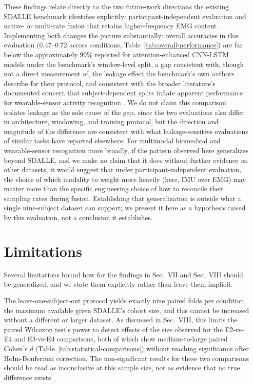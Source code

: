 \documentclass[conference]{IEEEtran}
\begin{document}
These findings relate directly to the two future-work directions the
existing SDALLE benchmark identifies explicitly: participant-independent
evaluation and native- or multi-rate fusion that retains
higher-frequency EMG content \cite{farouk2026sdalle}. Implementing
both changes the picture substantially: overall accuracies in this
evaluation ($0.47$--$0.72$ across conditions,
Table~\ref{tab:overall-performance}) are far below the approximately
99\% reported for attention-enhanced CNN-LSTM models under the
benchmark's window-level split, a gap consistent with, though not a
direct measurement of, the leakage effect the benchmark's own authors
describe for their protocol, and consistent with the broader
literature's documented concern that subject-dependent splits inflate
apparent performance for wearable-sensor activity recognition
\cite{rehman2024validation, cai2025generalizablehar}. We do not claim
this comparison isolates leakage as the sole cause of the gap, since
the two evaluations also differ in architecture, windowing, and
training protocol, but the direction and magnitude of the difference
are consistent with what leakage-sensitive evaluations of similar
tasks have reported elsewhere. For multimodal biomedical and
wearable-sensor recognition more broadly, if the pattern observed
here generalizes beyond SDALLE, and we make no claim that it does
without further evidence on other datasets, it would suggest that
under participant-independent evaluation, the choice of which
modality to weight more heavily (here, IMU over EMG) may matter more
than the specific engineering choice of how to reconcile their
sampling rates during fusion. Establishing that generalization is
outside what a single nine-subject dataset can support; we present it
here as a hypothesis raised by this evaluation, not a conclusion it
establishes.

\section{Limitations}
\label{sec:limitations}

Several limitations bound how far the findings in Sec.~VII and
Sec.~VIII should be generalized, and we state them explicitly rather
than leave them implicit.

The leave-one-subject-out protocol yields exactly nine paired folds
per condition, the maximum available given SDALLE's cohort size, and
this cannot be increased without a different or larger dataset. As
discussed in Sec.~VIII, this limits the paired Wilcoxon test's power
to detect effects of the size observed for the E2-vs-E4 and E3-vs-E4
comparisons, both of which show medium-to-large paired Cohen's $d$
(Table~\ref{tab:statistical-comparisons}) without reaching
significance after Holm-Bonferroni correction. The non-significant
results for these two comparisons should be read as inconclusive at
this sample size, not as evidence that no true difference exists.
\end{document}
